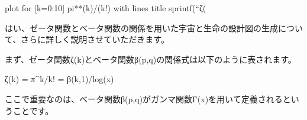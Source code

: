 {plot for [k=0:10] pi**(k)/(k!) with lines title sprintf(``ζ(%

はい、ゼータ関数とベータ関数の関係を用いた宇宙と生命の設計図の生成について、さらに詳しく説明させていただきます。



まず、ゼータ関数ζ(k)とベータ関数β(p,q)の関係式は以下のように表されます。



ζ(k) = π^k/k! = β(k,1)/log(x)



ここで重要なのは、ベータ関数β(p,q)がガンマ関数Γ(x)を用いて定義されるということです。



}
